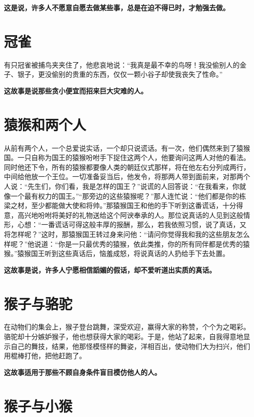 {\bfseries \color{red}这是说，许多人不愿意自愿去做某些事，总是在迫不得已时，才勉强去做。}

\section{冠雀}

有只冠雀被捕鸟夹夹住了，他悲哀地说：“我真是最不幸的鸟呀！我没偷别人的金子、银子，更没偷别的贵重的东西，仅仅一颗小谷子却使我丧失了性命。”

{\bfseries \color{red}这故事是说那些贪小便宜而招来巨大灾难的人。}

\section{猿猴和两个人}

从前有两个人，一个总爱说实话，一个却只说谎话。有一次，他们偶然来到了猿猴国。一只自称为国王的猿猴吩咐手下捉住这两个人，他要询问这两人对他的看法。同时他还下令，所有的猿猴都要像人类的朝廷仪式那样，将在他左右分列成两行，中间给他放一个王位。一切准备妥当后，他发令，将那两人带到面前来，对那两个人说：“先生们，你们看，我是怎样的国王？”说谎的人回答说：“在我看来，你就像一个最有权力的国王。”“那旁边的这些猿猴呢？”那人连忙说：“他们都是你的栋梁之材，至少都能做大使和将帅。”那猿猴国王和他的手下听到这番谎话，十分得意，高兴地吩咐将美好的礼物送给这个阿谀奉承的人。那位说真话的人见到这般情形，心想：“一番谎话可得这般丰厚的报酬，那么，若我依照习惯，说了真话，又将怎样呢？”这时，那猿猴国王转过身来问他：“请问你觉得我和我的这些朋友怎么样呢？”他说道：“你是一只最优秀的猿猴，依此类推，你的所有同伴都是优秀的猿猴。”猿猴国王听到这些真话后，恼羞成怒，将说真话的人扔给手下去处置。

{\bfseries \color{red}这故事是说，许多人宁愿相信謟媚的假话，却不爱听道出实质的真话。}

\section{猴子与骆驼}

在动物们的集会上，猴子登台跳舞，深受欢迎，赢得大家的称赞，个个为之喝彩。骆驼却十分嫉妒猴子，他也想获得大家的喝彩。于是，他站了起来，自我得意地显示自己的舞技，结果，他那怪模怪样的舞姿，洋相百出，使动物们大为扫兴，他们用棍棒打他，把他赶跑了。

{\bfseries \color{red}这故事适用于那些不顾自身条件盲目模仿他人的人。}

\section{猴子与小猴}


